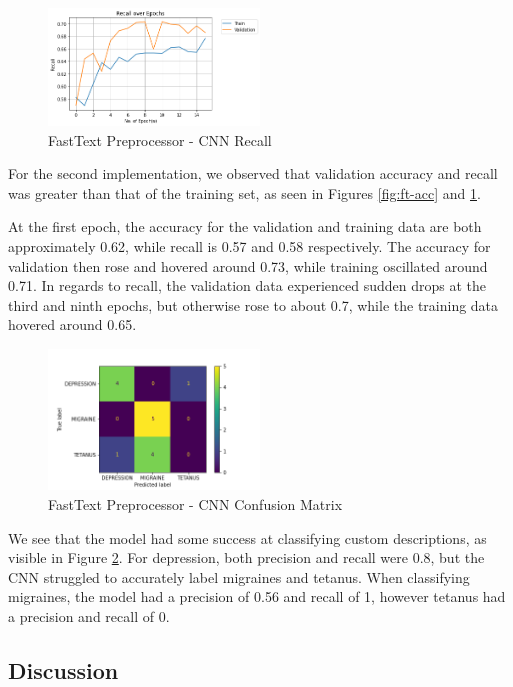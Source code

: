 \documentclass[12pt]{report}
\begin{document}
\begin{figure}[H]
	\centering
	\includegraphics[width=0.5\textwidth]{recall-1.png}
	\caption{FastText Preprocessor - CNN Recall}
	\label{fig:ft-rec}
\end{figure}

For the second implementation, we observed that validation accuracy and
recall was greater than that of the training set, as seen in Figures \ref{fig:ft-acc} and
\ref{fig:ft-rec}.

At the first epoch, the accuracy for the validation and training data are both
approximately 0.62, while recall is 0.57 and 0.58 respectively. The accuracy
for validation then rose and hovered around 0.73, while training oscillated
around 0.71. In regards to recall, the validation data experienced sudden drops
at the third and ninth epochs, but otherwise rose to about 0.7, while the
training data hovered around 0.65.

\begin{figure}[H]
	\centering
	\includegraphics[width=0.5\textwidth]{confusion_matrix_ft.png}
	\caption{FastText Preprocessor - CNN Confusion Matrix}
	\label{fig:ft-con}
\end{figure}

We see that the model had some success at classifying custom descriptions, as visible in
Figure \ref{fig:ft-con}.
For depression, both precision and recall were 0.8, but the CNN struggled to accurately
label migraines and tetanus. When classifying migraines, the model had a
precision of 0.56 and recall of 1, however tetanus had a precision and recall of
0.

\subsection{Discussion}
\end{document}
